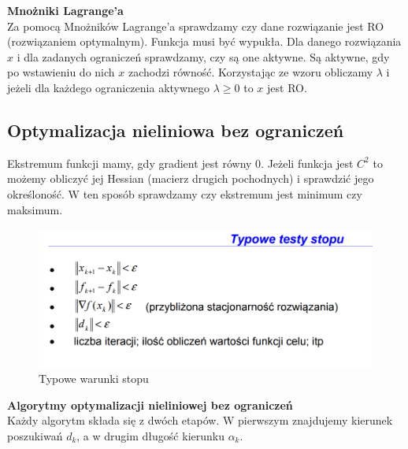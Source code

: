\documentclass[12pt]{article}
\begin{document}
\textbf{Mnożniki Lagrange'a}\\
Za pomocą Mnożników Lagrange'a sprawdzamy czy dane rozwiązanie jest RO (rozwiązaniem optymalnym). Funkcja musi być wypukła. Dla danego rozwiązania $x$ i dla zadanych ograniczeń sprawdzamy, czy są one aktywne. Są aktywne, gdy po wstawieniu do nich $x$ zachodzi równość. Korzystając ze wzoru obliczamy $\lambda$ i jeżeli dla każdego ograniczenia aktywnego $ \lambda \geq 0$ to $x$ jest RO.

\subsection{Optymalizacja nieliniowa bez ograniczeń}
Ekstremum funkcji mamy, gdy gradient jest równy 0. Jeżeli funkcja jest $C^{2}$ to możemy obliczyć jej Hessian (macierz drugich pochodnych) i sprawdzić jego określoność. W ten sposób sprawdzamy czy ekstremum jest minimum czy maksimum. 

\begin{figure}[H]
	\centering
	\includegraphics[scale=0.7]{Pictures/warunki_stopu}
	\caption{Typowe warunki stopu}
\end{figure}

\textbf{Algorytmy optymalizacji nieliniowej bez ograniczeń}\\
Każdy algorytm składa się z dwóch etapów. W pierwszym znajdujemy kierunek poszukiwań $d_{k}$, a w drugim długość kierunku $\alpha _{k}$.\\
\end{document}
